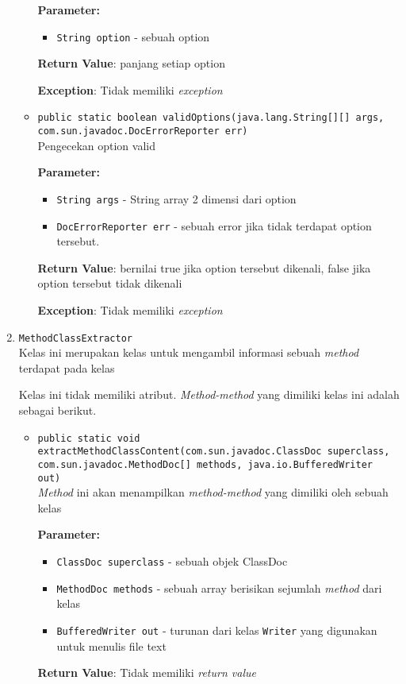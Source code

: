 \begin{enumerate}
\begin{itemize}
\textbf{Parameter:}
\begin{itemize}
\item \texttt{String option} - 
sebuah option
\end{itemize}
\textbf{Return Value}: panjang setiap option

\textbf{Exception}: Tidak memiliki \textit{exception}

\item \texttt{public static boolean validOptions(java.lang.String[][] args, com.sun.javadoc.DocErrorReporter err)}\\ 
Pengecekan option valid

\textbf{Parameter:}
\begin{itemize}
\item \texttt{String args} - 
String array 2 dimensi dari option
\item \texttt{DocErrorReporter err} - 
sebuah error jika tidak terdapat option tersebut.
\end{itemize}
\textbf{Return Value}: bernilai true jika option tersebut dikenali, false jika option
 tersebut tidak dikenali

\textbf{Exception}: Tidak memiliki \textit{exception}

\end{itemize}
\item \texttt{MethodClassExtractor}\\Kelas ini merupakan kelas untuk mengambil informasi sebuah \textit{method}
 terdapat pada kelas

Kelas ini tidak memiliki atribut. \textit{Method-method} yang dimiliki kelas ini adalah sebagai berikut.
\begin{itemize}
\item \texttt{public static void extractMethodClassContent(com.sun.javadoc.ClassDoc superclass, com.sun.javadoc.MethodDoc[] methods, java.io.BufferedWriter out)}\\ 
\textit{Method} ini akan menampilkan \textit{method-method} yang dimiliki
 oleh sebuah kelas

\textbf{Parameter:}
\begin{itemize}
\item \texttt{ClassDoc superclass} - 
sebuah objek ClassDoc
\item \texttt{MethodDoc methods} - 
sebuah array berisikan sejumlah \textit{method} dari kelas
\item \texttt{BufferedWriter out} - 
turunan dari kelas \texttt{Writer} yang digunakan untuk menulis
                   file text
\end{itemize}
\textbf{Return Value}: Tidak memiliki \textit{return value}


\end{itemize}
\end{enumerate}
